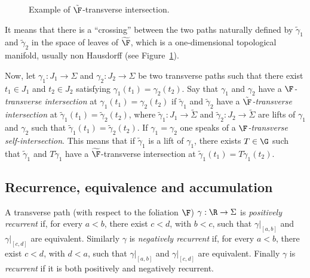 \begin{figure}
\begin{center}

\caption{Example of $\tilde{\F}$-transverse intersection.\label{Fig:extransverse}
}
\end{center}
\end{figure}

It means that there is a ``crossing'' between the two paths naturally defined by $\tilde\gamma_1$ and $\tilde\gamma_2$ in the space of leaves of $\widetilde{\F}$, which is a one-dimensional topological manifold, usually non Hausdorff (see Figure~\ref{Fig:extransverse}).


Now, let $\gamma_1:J_1\to \Sigma$ and $\gamma_2:J_2\to \Sigma$ be two transverse paths such that there exist $t_1\in J_1$ and $t_2\in J_2$ satisfying $\gamma_1(t_1)=\gamma_2(t_2)$. Say that $\gamma_1$ and $\gamma_2$ have a \emph{${\F}$-transverse intersection} at $\gamma_1(t_1)=\gamma_2(t_2)$ if $\tilde\gamma_1$ and $\tilde\gamma_2$ have a \emph{${\tilde{\F}}$-transverse intersection} at $\tilde\gamma_1(t_1)=\tilde\gamma_2(t_2)$, where $\tilde\gamma_1:J_1\to \tilde \Sigma$ and $\tilde\gamma_2:J_2\to \tilde \Sigma$ are lifts of $\gamma_1$ and $\gamma_2$ such that $\tilde\gamma_1(t_1)=\tilde\gamma_2(t_2)$. If $\gamma_1=\gamma_2$ one speaks of a \emph{$\F$-transverse self-intersection}. This means that if $\widetilde \gamma_1$ is a lift of $\gamma_1$, there exists $T\in\G$ such that $\widetilde\gamma_1$ and $T\widetilde\gamma_1$ have a $\widetilde{\F}$-transverse intersection at $\widetilde\gamma_1(t_1)=T\widetilde\gamma_1(t_2)$.



\subsection{Recurrence, equivalence and accumulation} A transverse path (with respect to the foliation $\F$) $\gamma:\R\to \Sigma$ is \emph{positively recurrent} if, for every $a<b$, there exist $c<d$, with $b<c$, such that $\gamma|_{[a,b]}$ and $\gamma|_{[c,d]}$ are equivalent. Similarly $\gamma$ is \emph{negatively recurrent} if, for every $a<b$, there exist $c<d$, with $d<a$, such that $\gamma|_{[a,b]}$ and $\gamma|_{[c,d]}$ are equivalent. Finally $\gamma$ is \emph{recurrent} if it is both positively and negatively recurrent.


